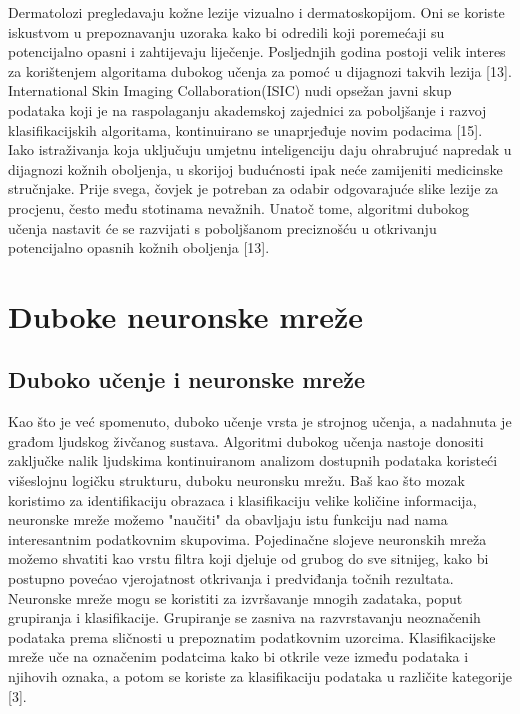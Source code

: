 \documentclass[times, utf8, zavrsni]{fer}
\begin{document}
\indent{}
Dermatolozi pregledavaju kožne lezije vizualno i dermatoskopijom. Oni se koriste iskustvom u prepoznavanju uzoraka kako bi odredili koji poremećaji su potencijalno opasni i zahtijevaju liječenje. Posljednjih godina postoji velik interes za korištenjem algoritama dubokog učenja za pomoć u dijagnozi takvih lezija [13].\\ 
\indent{}
International Skin Imaging Collaboration(ISIC) nudi opsežan javni skup podataka koji je na raspolaganju akademskoj zajednici za poboljšanje i razvoj klasifikacijskih algoritama, kontinuirano se unaprjeđuje novim podacima [15]. Iako istraživanja koja uključuju umjetnu inteligenciju daju ohrabrujuć napredak u dijagnozi kožnih oboljenja, u skorijoj budućnosti ipak neće zamijeniti medicinske stručnjake. Prije svega, čovjek je potreban za odabir odgovarajuće slike lezije za procjenu, često među stotinama nevažnih. Unatoč tome, algoritmi dubokog učenja nastavit će se razvijati s poboljšanom preciznošću u otkrivanju potencijalno opasnih kožnih oboljenja [13]. 


\chapter{Duboke neuronske mreže}

\section{Duboko učenje i neuronske mreže}

\indent{}
Kao što je već spomenuto, duboko učenje vrsta je strojnog učenja, a nadahnuta je građom ljudskog živčanog sustava. Algoritmi dubokog učenja nastoje donositi zaključke nalik ljudskima kontinuiranom analizom dostupnih podataka koristeći višeslojnu logičku strukturu, duboku neuronsku mrežu. Baš kao što mozak koristimo za identifikaciju obrazaca i klasifikaciju velike količine informacija, neuronske mreže možemo "naučiti" da obavljaju istu funkciju nad nama interesantnim podatkovnim skupovima. Pojedinačne slojeve neuronskih mreža možemo shvatiti kao vrstu filtra koji djeluje od grubog do sve sitnijeg, kako bi postupno povećao vjerojatnost otkrivanja i predviđanja točnih rezultata. Neuronske mreže mogu se koristiti za izvršavanje mnogih zadataka, poput grupiranja i klasifikacije. Grupiranje se zasniva na razvrstavanju neoznačenih podataka prema sličnosti u prepoznatim podatkovnim uzorcima. Klasifikacijske mreže uče na označenim  podatcima kako bi otkrile veze između podataka i njihovih oznaka, a potom se koriste za klasifikaciju podataka u različite kategorije [3].
\end{document}

